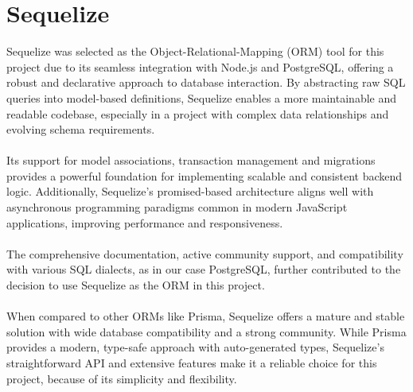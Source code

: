 \documentclass[a4paper,12pt]{report}
\begin{document}
\section{Sequelize}
Sequelize was selected as the Object-Relational-Mapping (ORM) tool for this project due to its seamless integration with Node.js and PostgreSQL, offering a robust and declarative approach to database interaction. By abstracting raw SQL queries into model-based definitions, Sequelize enables a more maintainable and readable codebase, especially in a project with complex data relationships and evolving schema requirements.\\\\
Its support for model associations, transaction management and migrations provides a powerful foundation for implementing scalable and consistent backend logic. Additionally, Sequelize's promised-based architecture aligns well with asynchronous programming paradigms common in modern JavaScript applications, improving performance and responsiveness. \parencite{sequelizegit}\\\\
The comprehensive documentation, active community support, and compatibility with various SQL dialects, as in our case PostgreSQL, further contributed to the decision to use Sequelize as the ORM in this project.\\\\
When compared to other ORMs like Prisma, Sequelize offers a mature and stable solution with wide database compatibility and a strong community. While Prisma provides a modern, type-safe approach with auto-generated types, Sequelize's straightforward API and extensive features make it a reliable choice for this project, because of its simplicity and flexibility. \parencite{Ormcomparemedium} \parencite{Ormcomparedhiwise} \\
\end{document}
